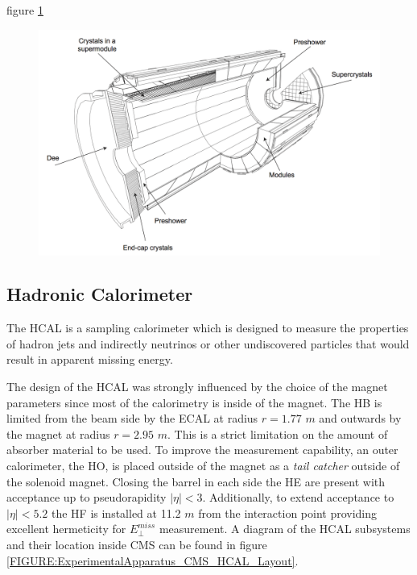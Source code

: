 figure \ref{FIGURE:ExperimentalApparatus_CMS_ECAL_Layout}

\begin{figure}[!htb]
  \centering
  \includegraphics[width=1.0\textwidth]{Chapter02/CMS/Images/CMS_ECAL_Layout.png}
  \caption{}
  \label{FIGURE:ExperimentalApparatus_CMS_ECAL_Layout}
\end{figure}


\subsection{Hadronic Calorimeter}
\label{SUBSECTION:ExperimentalApparatus_CMS_HCAL}


The \gls{HCAL} is a sampling calorimeter which is designed to measure the properties of hadron jets and indirectly neutrinos or other undiscovered particles that would result in apparent missing energy\cite{ARTICLE:CMSTechnicalProposal}. 

The design of the \gls{HCAL} was strongly influenced by the choice of the magnet parameters since most of the calorimetry is inside of the magnet. The \gls{HB} is limited from the beam side by the \gls{ECAL} at radius $r=1.77$ $m$ and outwards by the magnet at radius $r=2.95$ $m$. This is a strict limitation on the amount of absorber material to be used. To improve the measurement capability, an outer calorimeter, the \gls{HO}, is placed outside of the magnet as a \textit{tail catcher} outside of the solenoid magnet. Closing the barrel in each side the \gls{HE} are present with acceptance up to pseudorapidity $|\eta|<3$.  
Additionally, to extend acceptance to $|\eta|<5.2$ the \gls{HF} is installed at 11.2 $m$ from the interaction point providing excellent hermeticity for $E_{\perp}^{miss}$ measurement. A diagram of the \gls{HCAL} subsystems and their location inside \gls{CMS} can be found in figure \ref{FIGURE:ExperimentalApparatus_CMS_HCAL_Layout}.

